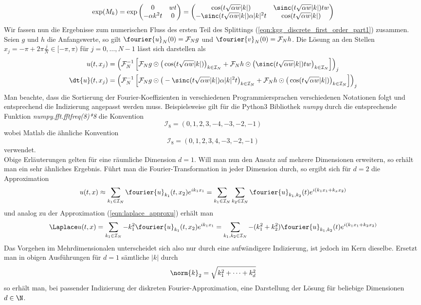 \[\exp(M_k)=\exp\begin{pmatrix}0 & wt\\ -\alpha k^2t & 0\end{pmatrix}=
\begin{pmatrix}\cos(t\sqrt{\alpha w}|k|) & \sinc(t\sqrt{\alpha w}|k|)tw\\-\sinc(t\sqrt{\alpha w}|k|)\alpha |k|^2t & \cos(t\sqrt{\alpha w}|k|)\end{pmatrix}\]
Wir fassen nun die Ergebnisse zum numerischen Fluss des ersten Teil des Splittings (\ref{eqn:kgg_discrete_first_order_part1}) zusammen.\\
Seien $g$ und $h$ die Anfangswerte, so gilt $\fourier{u}_N(0)=\mathcal{F}_Ng$ und $\fourier{v}_N(0)=\mathcal{F}_Nh$. Die Lösung an den Stellen $x_j=-\pi+2\pi\frac{j}{N}\in [-\pi,\pi)$ für $j=0,\dots,N-1$ lässt sich darstellen als
\begin{align*}
u(t,x_j)&=\left(\mathcal{F}_N^{-1}\left[\mathcal{F}_Ng\odot \big(\cos(t\sqrt{\alpha w}|k|)\big)_{k\in\mathcal{I}_N} + \mathcal{F}_Nh\odot \big(\sinc(t\sqrt{\alpha w}|k|)tw\big)_{k\in\mathcal{I}_N}\right]\right)_j\\
\dt{u}(t,x_j)&=\left(\mathcal{F}_N^{-1}\left[\mathcal{F}_Ng \odot \big(-\sinc(t\sqrt{\alpha w}|k|)\alpha|k|^2t\big)_{k\in\mathcal{I}_N}+\mathcal{F}_Nh\odot \big(\cos(t\sqrt{\alpha w}|k|)\big)_{k\in\mathcal{I}_N}\right]\right)_j
\end{align*}
Man beachte, dass die Sortierung der Fourier-Koeffizienten in verschiedenen Programmiersprachen verschiedenen Notationen folgt und entsprechend die Indizierung angepasst werden muss. Beispielsweise gilt für die Python3 Bibliothek \emph{numpy} durch die entsprechende Funktion \emph{numpy.fft.fftfreq(8)*8} die Konvention
\[\mathcal{I}_8=\left( 0,  1,  2,  3, -4, -3, -2, -1\right)\]
wobei Matlab die ähnliche Konvention
\[\mathcal{I}_8=\left( 0,  1,  2,  3, 4, -3, -2, -1\right)\]
verwendet.\\[0.3cm]
Obige Erläuterungen gelten für eine räumliche Dimension $d=1$. Will man nun den Ansatz auf mehrere Dimensionen erweitern, so erhält man ein sehr ähnliches Ergebnis.
Führt man die Fourier-Transformation in jeder Dimension durch, so ergibt sich für $d=2$ die Approximation
\[u(t,x)\approx\sum_{k_1\in\mathcal{I}_N}\fourier{u}_{k_1}(t,x_2)e^{ik_1x_1}=\sum_{k_1\in\mathcal{I}_N}\sum_{k_2\in\mathcal{I}_N}\fourier{u}_{k_1,k_2}(t)e^{i(k_1x_1+k_xx_2)}\]
und analog zu der Approximation (\ref{eqn:laplace_approxu}) erhält man
\[\Laplace u(t,x)=\sum_{k_1\in\mathcal{I}_N}-k_1^2\fourier{u}_{k_1}(t,x_2) e^{ik_1x_1}=\sum_{k_1,k_2\in\mathcal{I}_N}-(k_1^2+k_2^2)\fourier{u}_{k_1,k_2}(t)e^{i(k_1x_1+k_2x_2)}\]
Das Vorgehen im Mehrdimensionalen unterscheidet sich also nur durch eine aufwändigere Indizierung, ist jedoch im Kern dieselbe. Ersetzt man in obigen Ausführungen für $d=1$ sämtliche $|k|$ durch \[\norm{k}_2=\sqrt{k_1^2+\dots+k_d^2}\]so erhält man, bei passender Indizierung der diskreten Fourier-Approximation, eine Darstellung der Lösung für beliebige Dimensionen $d\in\N$.

